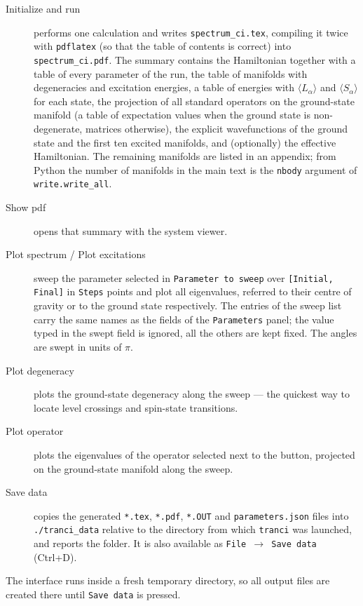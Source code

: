 \documentclass[11pt,a4paper]{article}
\newcommand{\op}[1]{\texttt{#1}}
\begin{document}
\begin{description}
\item[Initialize and run] performs one calculation and writes
      \op{spectrum\_ci.tex}, compiling it twice with \op{pdflatex} (so that the
      table of contents is correct) into \op{spectrum\_ci.pdf}.  The summary
      contains the Hamiltonian together with a table of every parameter of
      the run, the table of manifolds with degeneracies and excitation
      energies, a table of energies with $\langle L_\alpha\rangle$ and
      $\langle S_\alpha\rangle$ for each state, the projection of all
      standard operators on the ground-state manifold (a table of expectation
      values when the ground state is non-degenerate, matrices otherwise), the
      explicit wavefunctions of the ground state and the first ten excited
      manifolds, and (optionally) the effective Hamiltonian.  The remaining
      manifolds are listed in an appendix; from Python the number of
      manifolds in the main text is the \op{nbody} argument of
      \op{write.write\_all}.
\item[Show pdf] opens that summary with the system viewer.
\item[Plot spectrum / Plot excitations] sweep the parameter selected in
      \op{Parameter to sweep} over \op{[Initial, Final]} in \op{Steps} points
      and plot all eigenvalues, referred to their centre of gravity or to the
      ground state respectively.  The entries of the sweep list carry the same
      names as the fields of the \op{Parameters} panel; the value typed in the
      swept field is ignored, all the others are kept fixed.  The angles are
      swept in units of $\pi$.
\item[Plot degeneracy] plots the ground-state degeneracy along the sweep --- the
      quickest way to locate level crossings and spin-state transitions.
\item[Plot operator] plots the eigenvalues of the operator selected next to
      the button, projected on the ground-state manifold along the sweep.
\item[Save data] copies the generated \op{*.tex}, \op{*.pdf}, \op{*.OUT} and
      \op{parameters.json} files into \op{./tranci\_data} relative to the
      directory from which \op{tranci} was launched, and reports the folder.
      It is also available as \op{File $\to$ Save data} (Ctrl+D).
\end{description}

\noindent
The interface runs inside a fresh temporary directory, so all output files are
created there until \op{Save data} is pressed.
\end{document}

